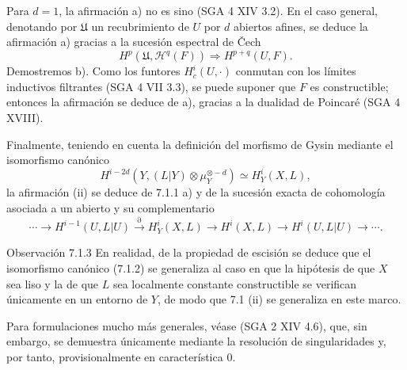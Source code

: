 Para $d=1$, la afirmación a) no es sino (SGA 4 XIV 3.2). En el caso general, denotando por $\mathfrak U$ un recubrimiento de $U$ por $d$ abiertos afines, se deduce la afirmación a) gracias a la sucesión espectral de Čech
\[
H^p(\mathfrak U,\mathcal H^q(F))\Rightarrow H^{p+q}(U,F).
\]
Demostremos b). Como los funtores $H_c^i(U,\cdot)$ conmutan con los límites inductivos filtrantes (SGA 4 VII 3.3), se puede suponer que $F$ es constructible; entonces la afirmación se deduce de a), gracias a la dualidad de Poincaré (SGA 4 XVIII).

Finalmente, teniendo en cuenta la definición del morfismo de Gysin mediante el isomorfismo canónico
\[
H^{i-2d}(Y,(L|Y)\otimes\mu_Y^{\otimes -d})\simeq H^i_Y(X,L),
\tag{7.1.2}
\]
la afirmación (ii) se deduce de 7.1.1 a) y de la sucesión exacta de cohomología asociada a un abierto y su complementario
\[
\cdots\to H^{i-1}(U,L|U)\xrightarrow{\partial}H^i_Y(X,L)\to H^i(X,L)\to H^i(U,L|U)\to\cdots .
\]

\begin{statement}{Observación 7.1.3}
En realidad, de la propiedad de escisión se deduce que el isomorfismo canónico (7.1.2) se generaliza al caso en que la hipótesis de que $X$ sea liso y la de que $L$ sea localmente constante constructible se verifican únicamente en un entorno de $Y$, de modo que 7.1 (ii) se generaliza en este marco.

Para formulaciones mucho más generales, véase (SGA 2 XIV 4.6), que, sin embargo, se demuestra únicamente mediante la resolución de singularidades y, por tanto, provisionalmente en característica $0$.
\end{statement}
